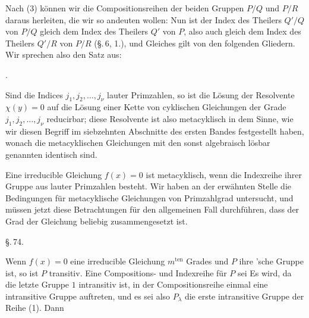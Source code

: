 
Nach (3) k\"onnen wir die Compositionsreihen der beiden Gruppen $P/Q$ und $P/R$
daraus herleiten, die wir so andeuten wollen:
Nun ist der Index des Theilers $Q'/Q$ von $P/Q$ gleich dem Index des Theilers $Q'$
von $P$, also auch gleich dem Index des Theilers $Q'/R$ von $P/R$ (\S.\,6, 1.), und
Gleiches gilt von den folgenden Gliedern. Wir sprechen also den Satz aus:

.  %

Sind die Indices $j_1, j_2, \ldots, j_\nu$ lauter Primzahlen, so ist die L\"osung
der Resolvente $\chi(y) = 0$ auf die L\"osung einer Kette von cyklischen
Gleichungen der Grade $j_1, j_2, \ldots, j_\nu$ reducirbar; diese Resolvente ist
also metacyklisch in dem Sinne, wie wir diesen Begriff im siebzehnten Abschnitte
des ersten Bandes festgestellt haben, wonach die metacyklischen Gleichungen mit den
sonst algebraisch l\"osbar genannten identisch sind.

Eine irreducible Gleichung $f(x) = 0$ ist metacyklisch, wenn die Indexreihe ihrer
Gruppe aus lauter Primzahlen besteht. Wir haben an der erw\"ahnten Stelle die
Bedingungen f\"ur metacyklische Gleichungen von Primzahlgrad untersucht, und
m\"ussen jetzt diese Betrachtungen f\"ur den allgemeinen Fall durchf\"uhren, dass
der Grad der Gleichung beliebig zusammengesetzt ist.

\begin{center}
\S.\,74.

\medskip

\end{center}

\bigskip

Wenn $f(x) = 0$ eine irreducible Gleichung $m^{\mathrm{ten}}$ Grades und $P$ ihre
'sche Gruppe ist, so ist $P$ transitiv. Eine Compositions- und Indexreihe
f\"ur $P$ sei
Es wird, da die letzte Gruppe $1$ intransitiv ist, in der Compositionsreihe einmal
eine intransitive Gruppe auftreten, und es sei also $P_\lambda$ die erste
intransitive Gruppe der Reihe (1). Dann

